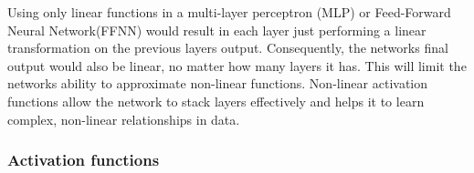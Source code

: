 Using only linear functions in a multi-layer perceptron (MLP) or Feed-Forward Neural Network(FFNN) would result in each layer just performing a linear transformation on the previous layers output. Consequently, the networks final output would also be linear, no matter how many layers it has. This will limit the networks ability to approximate non-linear functions. Non-linear activation functions allow the network to stack layers effectively and helps it to learn complex, non-linear relationships in data.














\subsubsection{Activation functions}


